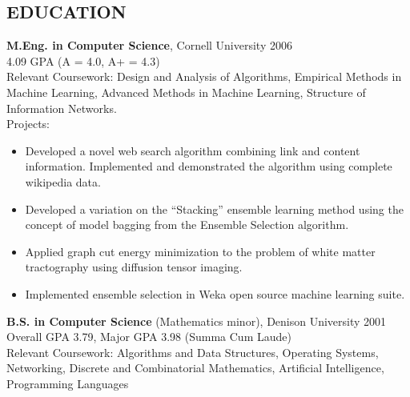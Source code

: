 \documentclass[10pt]{article}
\begin{document}
\subsection*{EDUCATION}
\begin{itemize}
\begin{item}
	\textbf{M.Eng. in Computer Science}, Cornell University 2006\\
	4.09 GPA (A = 4.0, A+ = 4.3)\\
  Relevant Coursework:  Design and Analysis of Algorithms, Empirical Methods in Machine Learning, Advanced Methods in Machine Learning, Structure of Information Networks.
\\
	Projects:
	\begin{itemize}
		\item{Developed a novel web search algorithm combining link and content information.  Implemented and demonstrated the algorithm using complete wikipedia data.}
		\item{Developed a variation on the ``Stacking'' ensemble learning method using the concept of model bagging from the Ensemble Selection algorithm.}
		\item{Applied graph cut energy minimization to the problem of white matter tractography using diffusion tensor imaging.}
                \item{Implemented ensemble selection in Weka open source machine learning suite.}
	\end{itemize}
\end{item}
\begin{item}
	\textbf{B.S. in Computer Science} (Mathematics minor), Denison University 2001\\
	Overall GPA 3.79, Major GPA 3.98 (Summa Cum Laude)\\
Relevant Coursework:  Algorithms and Data Structures, Operating Systems, Networking, Discrete and Combinatorial Mathematics, Artificial Intelligence, Programming Languages
\end{item}  
\end{itemize}
\end{document}
